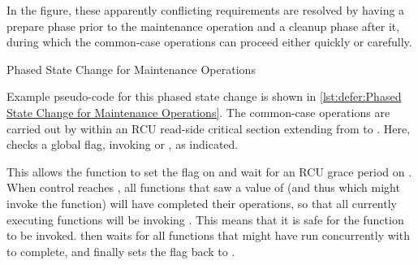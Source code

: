 In the figure, these apparently conflicting requirements are resolved by
having a prepare phase prior to the maintenance operation and a cleanup
phase after it, during which the common-case operations can proceed
either quickly or carefully.

\begin{listing}
\begin{fcvlabel}
\end{fcvlabel}
\caption{Phased State Change for Maintenance Operations}
\label{lst:defer:Phased State Change for Maintenance Operations}
\end{listing}

\begin{fcvref}
Example pseudo-code for this phased state change is shown in
\cref{lst:defer:Phased State Change for Maintenance Operations}.
The common-case operations are carried out by  within an RCU
read-side critical section extending from  to .
Here,  checks a global  flag, invoking
 or , as indicated.
\end{fcvref}

\begin{fcvref}
This allows the  function to set the  flag
on  and wait for an RCU grace period on .
When control reaches , all  functions that saw a
 value of  (and thus which might invoke
the  function) will have completed their operations,
so that all currently executing  functions will be invoking
.
This means that it is safe for the  function to be
invoked.
 then waits for all  functions that might have
run concurrently with  to complete, and finally
 sets the  flag back to .
\end{fcvref}

